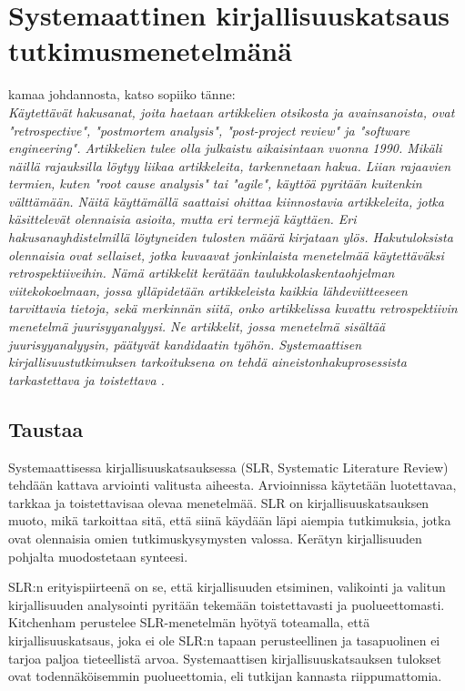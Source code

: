 \section{Systemaattinen kirjallisuuskatsaus tutkimusmenetelmänä}


kamaa johdannosta, katso sopiiko tänne:\\
\textit{Käytettävät hakusanat, joita haetaan artikkelien otsikosta ja avainsanoista, ovat "retrospective", "postmortem analysis", "post-project review" ja "software engineering". Artikkelien tulee olla julkaistu aikaisintaan vuonna 1990. Mikäli näillä rajauksilla löytyy liikaa artikkeleita, tarkennetaan hakua. Liian rajaavien termien, kuten "root cause analysis" tai "agile", käyttöä pyritään kuitenkin välttämään. Näitä käyttämällä saattaisi ohittaa kiinnostavia artikkeleita, jotka käsittelevät olennaisia asioita, mutta eri termejä käyttäen. Eri hakusanayhdistelmillä löytyneiden tulosten määrä kirjataan ylös.
Hakutuloksista olennaisia ovat sellaiset, jotka kuvaavat jonkinlaista menetelmää käytettäväksi retrospektiiveihin. Nämä artikkelit kerätään taulukkolaskentaohjelman viitekokoelmaan, jossa ylläpidetään artikkeleista kaikkia lähdeviitteeseen tarvittavia tietoja, sekä merkinnän siitä, onko artikkelissa kuvattu retrospektiivin menetelmä juurisyyanalyysi. Ne artikkelit, jossa menetelmä sisältää juurisyyanalyysin, päätyvät kandidaatin työhön. Systemaattisen kirjallisuustutkimuksen tarkoituksena on tehdä aineistonhakuprosessista tarkastettava ja toistettava \citep{Kitchenham2007}.}




\subsection{Taustaa}
Systemaattisessa kirjallisuuskatsauksessa (SLR, Systematic Literature Review) tehdään kattava arviointi valitusta aiheesta. Arvioinnissa käytetään luotettavaa, tarkkaa ja toistettavisaa olevaa menetelmää. SLR on kirjallisuuskatsauksen muoto, mikä tarkoittaa sitä, että siinä käydään läpi aiempia tutkimuksia, jotka ovat olennaisia omien tutkimuskysymysten valossa. Kerätyn kirjallisuuden pohjalta muodostetaan synteesi.\citep{Kitchenham2007}

SLR:n erityispiirteenä on se, että kirjallisuuden etsiminen, valikointi ja valitun kirjallisuuden analysointi pyritään tekemään toistettavasti ja puolueettomasti. Kitchenham perustelee SLR-menetelmän hyötyä toteamalla, että kirjallisuuskatsaus, joka ei ole SLR:n tapaan perusteellinen ja tasapuolinen ei tarjoa paljoa tieteellistä arvoa. Systemaattisen kirjallisuuskatsauksen tulokset ovat todennäköisemmin puolueettomia, eli tutkijan kannasta riippumattomia. \citep{Kitchenham2007}

